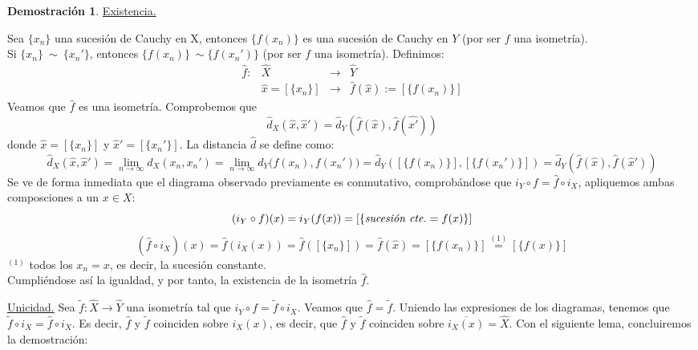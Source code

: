 \documentclass[12pt,twoside]{report}
\theoremstyle{azul}
\theoremstyle{azul2}
\theoremstyle{plain}
\theoremstyle{definition}
\newtheorem*{dem}{Demostración}
\theoremstyle{remark}
\begin{document}
\begin{dem}
\underline{Existencia.}

Sea $\{x_n\}$ una sucesión de Cauchy en X, entonces $\{f(x_n)\}$ es una sucesión de Cauchy en $Y$ (por ser $f$ una isometría). \\
Si $\{x_n\} \: \sim \: \{x_n'\}$, entonces $\{f(x_n)\} \: \sim \{f(x_n')\}$ (por ser $f$ una isometría).
Definimos:\\ $$\begin{array}{rccl}
     \hat{f}: & \hat{X} & \longrightarrow & \hat{Y}  \\
     \; & \hat{x}= [\{x_n\}] & \longrightarrow & \hat{f}(\hat{x}):=[\{f(x_n)\}]
\end{array} $$
Veamos que $\hat{f}$ es una isometría. Comprobemos que 
$$\hat{d}_X(\hat{x}, \hat{x}') = \hat{d}_Y(\hat{f}(\hat{x}),\hat{f}(\hat{x'}))$$
donde $\hat{x}=[\{x_n\}]$ y $\hat{x}'=[\{x_n'\}]$. La distancia $\hat{d}$ se define como:
$$\hat{d}_X(\hat{x},\hat{x}')=\lim_{n \to \infty} d_X(x_n, x_n')=\lim_{n \to \infty} d_Y\big(f(x_n), f(x_n')\big)=\hat{d}_Y([\{f(x_n)\}], [\{f(x_n')\}])=\hat{d}_Y(\hat{f}(\hat{x}), \hat{f}(\hat{x}'))$$
Se ve de forma inmediata que el diagrama observado previamente es conmutativo, comprobándose que $i_Y \circ f = \hat{f} \circ i_X$, apliquemos ambas composciones a un $x \in X$:
$$(i_Y \circ f)(x)=i_Y(f(x))=[\{\text{\textit{sucesión cte.}}=f(x)\}]$$
$$(\hat{f} \circ i_X)(x)=\hat{f}(i_X(x))=\hat{f}([\{x_n\}])=\hat{f}(\hat{x})=[\{f(x_n)\}]\stackrel{(1)}{=}[\{f(x)\}]$$
$^{(1)}$ todos los $x_n=x$, es decir, la sucesión constante. \\ 
Cumpli{\'e}ndose así la igualdad, y por tanto, la existencia de la isometría $\hat{f}$.

\underline{Unicidad.}
Sea $\widetilde{f}: \hat{X} \longrightarrow \hat{Y}$ una isometría tal que $i_Y \circ f = \widetilde{f} \circ i_X$. Veamos que $\hat{f}=\widetilde{f}$. Uniendo las expresiones de los diagramas, tenemos que $\widetilde{f} \circ i_X = \hat{f} \circ i_X$. Es decir, $\hat{f}$ y $\widetilde{f}$ coinciden sobre $i_X(x)$, es decir, que $\hat{f}$ y $\widetilde{f}$ coinciden sobre $\overline{i_X(x)} = \hat{X}$. Con el siguiente lema, concluiremos la demostración:
\end{dem}
\end{document}
